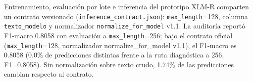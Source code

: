 Entrenamiento, evaluación por lote e inferencia del prototipo XLM-R comparten un contrato versionado (\texttt{inference\_contract.json}): \texttt{max\_length}=128, columna \texttt{texto\_modelo} y normalizador \texttt{normalize\_for\_model} v1.1. La auditoría reportó F1-macro 0.8058 con evaluación a \texttt{max\_length}=256; bajo el contrato oficial (\texttt{max\_length}=128, normalizador normalize\_for\_model v1.1), el F1-macro es 0.8058 (0.0\% de predicciones distintas frente a la ruta diagnóstica a 256, F1=0.8058). Sin normalización sobre texto crudo, 1.74\% de las predicciones cambian respecto al contrato.
